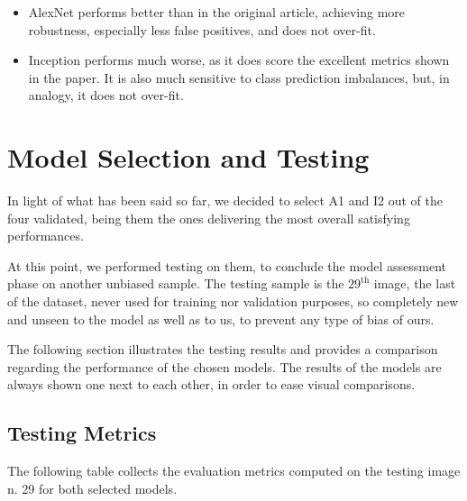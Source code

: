 \begin{itemize}
    \item AlexNet performs better than in the original article, achieving more robustness, especially less false positives, and does not over-fit.
    \item Inception  performs much worse, as it does score the excellent metrics shown in the paper. It is also much sensitive to class prediction imbalances, but, in analogy, it does not over-fit.
\end{itemize}

\section{Model Selection and Testing}

\par
In light of what has been said so far, we decided to select A1 and I2 out of the four validated, being them the ones delivering the most overall satisfying performances.

\par
At this point, we performed testing on them, to conclude the model assessment phase on another unbiased sample. The testing sample is the $29^{\text{th}}$ image, the last of the dataset, never used for training nor validation purposes, so completely new and unseen to the model as well as to us, to prevent any type of bias of ours.

\par
The following section illustrates the testing results and provides a comparison regarding the performance of the chosen models. The results of the models are always shown one next to each other, in order to ease visual comparisons.

\subsection{Testing Metrics}

\par
The following table collects the evaluation metrics computed on the testing image n. 29 for both selected models.

